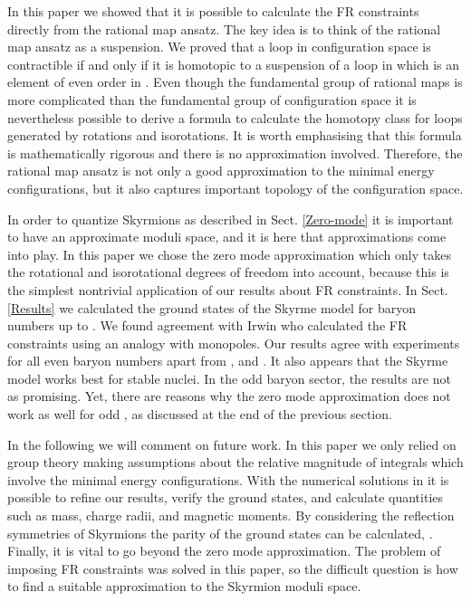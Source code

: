 \documentclass[a4paper,12pt]{article}
\begin{document}
In this paper we showed that it is possible to calculate the FR 
constraints directly from the rational map ansatz. The key idea is to 
think of the rational map ansatz as a suspension. We proved that a loop 
in configuration space \coordHE{} is contractible if and only if it is 
homotopic to a suspension of a loop in \coordHE{} which is 
an element of even order in \coordHE{}. 
Even though the fundamental group of rational maps is more 
complicated than the fundamental group of configuration space it is 
nevertheless possible to derive a formula to calculate the 
homotopy class for loops generated by rotations 
and isorotations. It is worth emphasising that this formula is 
mathematically rigorous and there is no approximation involved. Therefore, 
the rational map ansatz is not only a good approximation to the minimal 
energy configurations, but it also captures important topology of the
configuration space.

In order to quantize Skyrmions as described in Sect. 
\ref{Zero-mode} it is important to have an approximate moduli space, and 
it is here that approximations come into play. In this paper we chose 
the zero mode approximation which only takes the rotational and 
isorotational degrees of freedom into account, because this is the 
simplest nontrivial application of our results about FR constraints.
In Sect. \ref{Results} we calculated the ground states of the Skyrme 
model for baryon numbers up to \coordHE{}. 
We found agreement with Irwin \cite{Irwin:1998bs} who calculated the FR 
constraints using an analogy with monopoles. Our results agree with 
experiments for all even baryon numbers apart from \coordHE{}, \coordHE{} and \coordHE{}. 
It also appears that the Skyrme model works best for stable nuclei. In the 
odd baryon sector, the results are not as promising. Yet, there are
reasons why the zero mode approximation does not work as well for odd
\coordHE{}, as discussed at the end of the previous section.

In the following we will comment on future work.
In this paper we only relied on group theory making assumptions about 
the relative magnitude of integrals which involve the minimal energy 
configurations. 
With the numerical solutions in \cite{Battye:2001qn} it is possible to 
refine our results, verify the ground states, and calculate quantities 
such as mass, charge radii, and magnetic moments. By considering the 
reflection symmetries of Skyrmions the parity 
of the ground states can be calculated, \cite{Irwin:1998bs}. 
Finally, it is vital to go beyond the zero mode approximation. 
The problem of imposing FR constraints was solved in this paper, so the 
difficult question is how to find a suitable approximation to the Skyrmion 
moduli space. 
\end{document}
